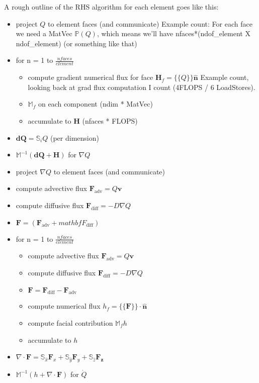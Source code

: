 \documentclass[11pt]{article}
\renewcommand{\vec}[1]{\bm{#1}}
\begin{document}
A rough outline of the RHS algorithm for each element goes like this:
\begin{itemize}
\item project $Q$ to element faces (and communicate)  Example count: For each face we need a MatVec $\mathbb{P}(Q)$, which means we'll have nfaces*(ndof\_element X ndof\_element) (or something like that)
\item for n = 1 to $\frac{nfaces}{element}$
  \begin{itemize}
  \item compute gradient numerical flux for face $\mathbf{H}_f = \{\{Q\}\}\hat{\mathbf{n}}$ Example count, looking back at grad flux computation I count (4FLOPS / 6 LoadStores).
  \item $\mathbb{M}_f$ on each component (ndim * MatVec)
  \item accumulate to $\mathbf{H}$ (nfaces * FLOPS)
  \end{itemize}
\item $\vec{dQ} = \mathbb{S}_i Q$ (per dimension)
\item $\mathbb{M}^{-1}(\vec{dQ} + \mathbf{H})$ for $\nabla{Q}$
\item project $\nabla{Q}$ to element faces (and communicate)
\item compute advective flux $\mathbf{F}_\text{adv} = Q\vec{v}$
\item compute diffusive flux $\mathbf{F}_\text{diff} = -D\nabla{Q}$
 \item $\mathbf{F} = \left(\mathbf{F}_\text{adv} + mathbf{F}_\text{diff}\right)$ 
\item for n = 1 to $\frac{nfaces}{element}$
  \begin{itemize}
  \item compute advective flux $\mathbf{F}_\text{adv} = Q\vec{v}$
  \item compute diffusive flux $\mathbf{F}_\text{diff} = -D\nabla{Q}$
  \item $\mathbf{F} = \mathbf{F}_\text{diff} - \mathbf{F}_\text{adv}$
  \item compute numerical flux $h_f=\{\{\mathbf{F}\}\} \cdot \hat{\mathbf{n}}$
  \item compute facial contribution $\mathbb{M}_f h$
  \item accumulate to $h$
  \end{itemize}
\item $\nabla \cdot \mathbf{F} = \mathbb{S}_{\hat{x}}\mathbf{F}_x + \mathbb{S}_{\hat{y}}\mathbf{F}_y + \mathbb{S}_{\hat{z}}\mathbf{F_z}$
\item $\mathbb{M}^{-1}(h + \nabla\cdot\mathbf{F})$ for $\dot{Q}$
\end{itemize}
\end{document}

